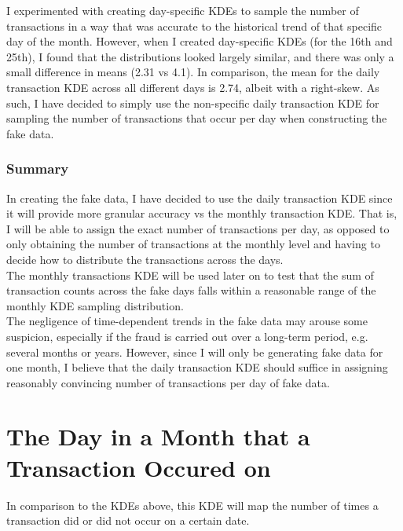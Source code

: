 \documentclass[11pt]{article}
\begin{document}
I experimented with creating day-specific KDEs to sample the number of
transactions in a way that was accurate to the historical trend of that
specific day of the month. However, when I created day-specific KDEs
(for the 16th and 25th), I found that the distributions looked largely
similar, and there was only a small difference in means (2.31 vs 4.1).
In comparison, the mean for the daily transaction KDE across all
different days is 2.74, albeit with a right-skew. As such, I have
decided to simply use the non-specific daily transaction KDE for
sampling the number of transactions that occur per day when constructing
the fake data.

\subsubsection{Summary}

In creating the fake data, I have decided to use the daily transaction
KDE since it will provide more granular accuracy vs the monthly
transaction KDE. That is, I will be able to assign the exact number of
transactions per day, as opposed to only obtaining the number of
transactions at the monthly level and having to decide how to distribute
the transactions across the days.\\

The monthly transactions KDE will be used later on to test that the sum
of transaction counts across the fake days falls within a reasonable
range of the monthly KDE sampling distribution.\\

The negligence of time-dependent trends in the fake data may arouse some
suspicion, especially if the fraud is carried out over a long-term
period, e.g. several months or years. However, since I will only be
generating fake data for one month, I believe that the daily transaction
KDE should suffice in assigning reasonably convincing number of
transactions per day of fake data.

\newpage
    \section{The Day in a Month that a Transaction Occured on}

In comparison to the KDEs above, this KDE will map the number of times a
transaction did or did not occur on a certain date.
\end{document}
